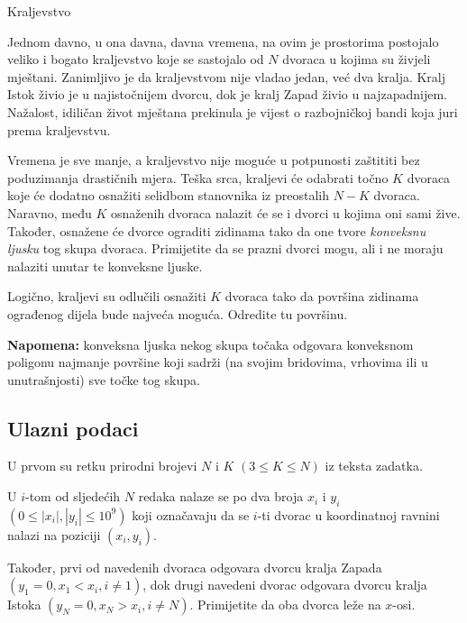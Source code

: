 \begin{statement}[
  problempoints=100,
  timelimit=1 sekunda,
  memorylimit=512 MiB,
]{Kraljevstvo}

Jednom davno, u ona davna, davna vremena, na ovim je prostorima postojalo
veliko i bogato kraljevstvo koje se sastojalo od $N$ dvoraca u kojima su živjeli
mještani. Zanimljivo je da kraljevstvom nije vladao jedan, već dva kralja.
Kralj Istok živio je u najistočnijem dvorcu, dok je kralj Zapad živio u
najzapadnijem. Nažalost, idiličan život mještana prekinula je vijest o
razbojničkoj bandi koja juri prema kraljevstvu.

Vremena je sve manje, a kraljevstvo nije moguće u potpunosti zaštititi bez
poduzimanja drastičnih mjera. Teška srca, kraljevi će odabrati točno $K$
dvoraca koje će dodatno osnažiti selidbom stanovnika iz preostalih $N - K$
dvoraca. Naravno, među $K$ osnaženih dvoraca nalazit će se i dvorci u kojima
oni sami žive.  Također, osnažene će dvorce ograditi zidinama tako da one
tvore \textit{konveksnu ljusku} tog skupa dvoraca. Primijetite da se prazni
dvorci mogu, ali i ne moraju nalaziti unutar te konveksne ljuske.

Logično, kraljevi su odlučili osnažiti $K$ dvoraca tako da površina zidinama
ograđenog dijela bude najveća moguća. Odredite tu površinu.

\textbf{Napomena:} konveksna ljuska nekog skupa točaka odgovara konveksnom
poligonu najmanje površine koji sadrži (na svojim bridovima, vrhovima ili
u unutrašnjosti) sve točke tog skupa.

\subsection*{Ulazni podaci}
U prvom su retku prirodni brojevi $N$ i $K$ $(3 \le K \le N)$ iz teksta zadatka.

U $i$-tom od sljedećih $N$ redaka nalaze se po dva broja $x_i$ i $y_i$ $(0 \leq
|x_i|, |y_i| \leq 10^9)$ koji označavaju da se $i$-ti dvorac u koordinatnoj
ravnini nalazi na poziciji $(x_i, y_i)$.

Također, prvi od navedenih dvoraca odgovara dvorcu kralja Zapada $(y_1 = 0, x_1
< x_i, i \ne 1)$, dok drugi navedeni dvorac odgovara dvorcu kralja Istoka
$(y_N = 0, x_N > x_i, i \ne N)$. Primijetite da oba dvorca leže na $x$-osi.


\end{statement}
